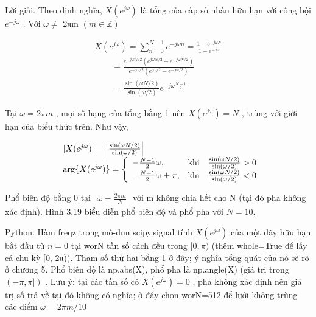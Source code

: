 \documentclass[
  10
]{article}
\begin{document}
Lời giải. Theo định nghĩa, \(X ( e ^ { j \omega } )\) là tổng của cấp số
nhân hữu hạn với công bội \(e ^ { - j \omega }\) . Với \(\omega \neq\)
2πm \(( m \in \mathbb { Z } )\)

\[
\begin{array}{l} X (e ^ {j \omega}) = \sum_ {n = 0} ^ {N - 1} e ^ {- j \omega n} = \frac {1 - e ^ {- j \omega N}}{1 - e ^ {- j \omega}} \\ \qquad = \frac {e ^ {- j \omega N / 2} \left(e ^ {j \omega N / 2} - e ^ {- j \omega N / 2}\right)}{e ^ {- j \omega / 2} \left(e ^ {j \omega / 2} - e ^ {- j \omega / 2}\right)} \\ \qquad = \frac {\sin (\omega N / 2)}{\sin (\omega / 2)} e ^ {- j \omega \frac {N - 1}{2}} \end{array}
\]

Tại \(\omega = 2 \pi m\) , mọi số hạng của tổng bằng 1 nên
\(X ( e ^ { j \omega } ) = N\) , trùng với giới hạn của biểu thức trên.
Như vậy,

\[
\begin{array}{r l} & {| X (e ^ {j \omega}) | = \left| \frac {\sin (\omega N / 2)}{\sin (\omega / 2)} \right|} \\ & {\arg \{X (e ^ {j \omega}) \} = \left\{ \begin{array}{l l} {- \frac {N - 1}{2} \omega ,} & {\mathrm{khi} \quad \frac {\sin (\omega N / 2)}{\sin (\omega / 2)} > 0} \\ {- \frac {N - 1}{2} \omega \pm \pi ,} & {\mathrm{khi} \quad \frac {\sin (\omega N / 2)}{\sin (\omega / 2)} <   0} \end{array} \right.} \end{array}
\]

Phổ biên độ bằng 0 tại
\(\begin{array} { r } { \omega = \frac { 2 \pi m } { N } } \end{array}\)
với m không chia hết cho N (tại đó pha không xác định). Hình 3.19 biểu
diễn phổ biên độ và phổ pha với \(N = 1 0 .\) 

Python. Hàm freqz trong mô-đun scipy.signal tính
\(X ( e ^ { j \omega } )\) của một dãy hữu hạn bắt đầu từ \(n = 0\) tại
worN tần số cách đều trong \([ 0 , \pi )\) (thêm whole=True để lấy cả
chu kỳ {[}0, 2π)). Tham số thứ hai bằng 1 ở đây; ý nghĩa tổng quát của
nó sẽ rõ ở chương 5. Phổ biên độ là np.abs(X), phổ pha là np.angle(X)
(giá trị trong \(( - \pi , \pi ] )\) . Lưu ý: tại các tần số có
\(X ( e ^ { j \omega } ) = 0\) , pha không xác định nên giá trị số trả
về tại đó không có nghĩa; ở đây chọn worN=512 để lưới không trùng các
điểm \(\omega = 2 \pi m / 1 0\)
\end{document}
